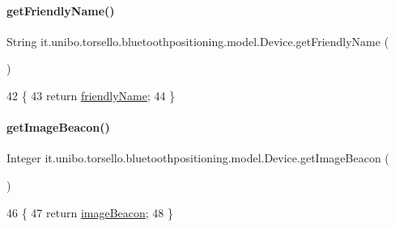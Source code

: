 \paragraph{\texorpdfstring{get\+Friendly\+Name()}{getFriendlyName()}}
{\footnotesize\ttfamily String it.\+unibo.\+torsello.\+bluetoothpositioning.\+model.\+Device.\+get\+Friendly\+Name (\begin{DoxyParamCaption}{ }\end{DoxyParamCaption})}


\begin{DoxyCode}
42                                     \{
43         \textcolor{keywordflow}{return} \hyperlink{classit_1_1unibo_1_1torsello_1_1bluetoothpositioning_1_1model_1_1Device_aa9a540b316c9de7f9b3a94f58570f6d3_aa9a540b316c9de7f9b3a94f58570f6d3}{friendlyName};
44     \}
\end{DoxyCode}
\hypertarget{classit_1_1unibo_1_1torsello_1_1bluetoothpositioning_1_1model_1_1Device_a0fe04c6168a9a13bdf65eb0e5d407d37_a0fe04c6168a9a13bdf65eb0e5d407d37}{}\label{classit_1_1unibo_1_1torsello_1_1bluetoothpositioning_1_1model_1_1Device_a0fe04c6168a9a13bdf65eb0e5d407d37_a0fe04c6168a9a13bdf65eb0e5d407d37} 
\paragraph{\texorpdfstring{get\+Image\+Beacon()}{getImageBeacon()}}
{\footnotesize\ttfamily Integer it.\+unibo.\+torsello.\+bluetoothpositioning.\+model.\+Device.\+get\+Image\+Beacon (\begin{DoxyParamCaption}{ }\end{DoxyParamCaption})}


\begin{DoxyCode}
46                                     \{
47         \textcolor{keywordflow}{return} \hyperlink{classit_1_1unibo_1_1torsello_1_1bluetoothpositioning_1_1model_1_1Device_a54d308c064bbad3b1680895680697dd7_a54d308c064bbad3b1680895680697dd7}{imageBeacon};
48     \}
\end{DoxyCode}
\hypertarget{classit_1_1unibo_1_1torsello_1_1bluetoothpositioning_1_1model_1_1Device_a7f7e47588f721b360447d0f6ae2c4a9d_a7f7e47588f721b360447d0f6ae2c4a9d}{}\label{classit_1_1unibo_1_1torsello_1_1bluetoothpositioning_1_1model_1_1Device_a7f7e47588f721b360447d0f6ae2c4a9d_a7f7e47588f721b360447d0f6ae2c4a9d} 
